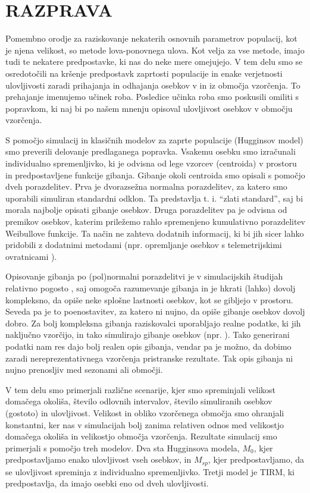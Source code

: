 \section{RAZPRAVA}
Pomembno orodje za raziskovanje nekaterih osnovnih parametrov populacij, kot je njena velikost, so metode lova-ponovnega ulova. Kot velja za vse metode, imajo tudi te nekatere predpostavke, ki nas do neke mere omejujejo. V tem delu smo se osredotočili na kršenje predpostavk zaprtosti populacije in enake verjetnosti ulovljivosti zaradi prihajanja in odhajanja osebkov v in iz območja vzorčenja. To prehajanje imenujemo učinek roba. Posledice učinka roba smo poskusili omiliti s popravkom, ki naj bi po našem mnenju opisoval ulovljivost osebkov v območju vzorčenja.

S pomočjo simulacij in klasičnih modelov za zaprte populacije (Hugginsov model) smo preverili delovanje predlaganega popravka. Vsakemu osebku smo izračunali individualno spremenljivko, ki je odvisna od lege vzorcev (centroida) v prostoru in predpostavljene funkcije gibanja. Gibanje okoli centroida smo opisali s pomočjo dveh porazdelitev. Prva je dvorazsežna normalna porazdelitev, za katero smo uporabili simuliran standardni odklon. Ta predstavlja t. i. ``zlati standard'', saj bi morala najbolje opisati gibanje osebkov. Druga porazdelitev pa je odvisna od premikov osebkov, katerim priležemo rahlo spremenjeno kumulativno porazdelitev Weibullove funkcije. Ta način ne zahteva dodatnih informacij, ki bi jih sicer lahko pridobili z dodatnimi metodami (npr. opremljanje osebkov s telemetrijskimi ovratnicami \citep{ivan-et-al-2013-aux}).

Opisovanje gibanja po (pol)normalni porazdelitvi je v simulacijskih študijah relativno pogosto \citep{bolker_ecological_2008, ivan_using_2013}, saj omogoča razumevanje gibanja in je hkrati (lahko) dovolj kompleksno, da opiše neke splošne lastnosti osebkov, kot se gibljejo v prostoru. Seveda pa je to poenostavitev, za katero ni nujno, da opiše gibanje osebkov dovolj dobro. Za bolj kompleksna gibanja raziskovalci uporabljajo realne podatke, ki jih naključno vzorčijo, in tako simulirajo gibanje osebkov (npr. \citealp{manning_estimating_2010}). Tako generirani podatki nam res dajo bolj realen opis gibanja, vendar pa je možno, da dobimo zaradi nereprezentativnega vzorčenja pristranske rezultate. Tak opis gibanja ni nujno prenosljiv med sezonami ali območji.

V tem delu smo primerjali različne scenarije, kjer smo spreminjali velikost domačega okoliša, število odlovnih intervalov, število simuliranih osebkov (gostoto) in ulovljivost. Velikost in obliko vzorčenega območja smo ohranjali konstantni, ker nas v simulacijah bolj zanima relativen odnos med velikostjo domačega okoliša in velikostjo območja vzorčenja. Rezultate simulacij smo primerjali s pomočjo treh modelov. Dva sta Hugginsova modela, $M_0$, kjer predpostavljamo enako ulovljivost vseh osebkov, in $M_{sp}$, kjer predpostavljamo, da se ulovljivost spreminja z individualno spremenljivko. Tretji model je TIRM, ki predpostavlja, da imajo osebki eno od dveh ulovljivosti.

